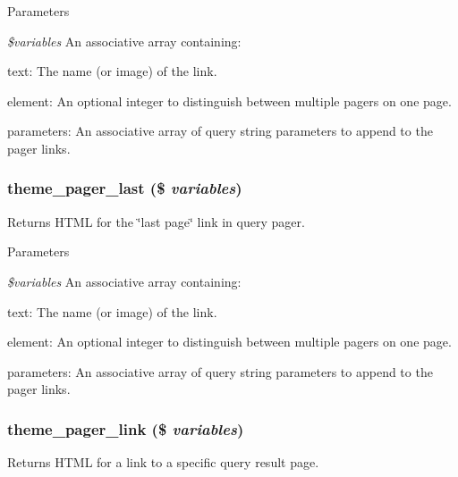 \begin{DoxyParams}{Parameters}
\item[{\em \$variables}]An associative array containing:
\begin{DoxyItemize}
\item text: The name (or image) of the link.
\item element: An optional integer to distinguish between multiple pagers on one page.
\item parameters: An associative array of query string parameters to append to the pager links. 
\end{DoxyItemize}\end{DoxyParams}
\hypertarget{group__themeable_ga906e18f1c174adbec2076cc886f8a102}{
\subsubsection[{theme\_\-pager\_\-last}]{\setlength{\rightskip}{0pt plus 5cm}theme\_\-pager\_\-last (\$ {\em variables})}}
\label{group__themeable_ga906e18f1c174adbec2076cc886f8a102}
Returns HTML for the \char`\"{}last page\char`\"{} link in query pager.


\begin{DoxyParams}{Parameters}
\item[{\em \$variables}]An associative array containing:
\begin{DoxyItemize}
\item text: The name (or image) of the link.
\item element: An optional integer to distinguish between multiple pagers on one page.
\item parameters: An associative array of query string parameters to append to the pager links. 
\end{DoxyItemize}\end{DoxyParams}
\hypertarget{group__themeable_ga1f17f9bb29c5c0d1b58ff4cba8e2499a}{
\subsubsection[{theme\_\-pager\_\-link}]{\setlength{\rightskip}{0pt plus 5cm}theme\_\-pager\_\-link (\$ {\em variables})}}
\label{group__themeable_ga1f17f9bb29c5c0d1b58ff4cba8e2499a}
Returns HTML for a link to a specific query result page.


